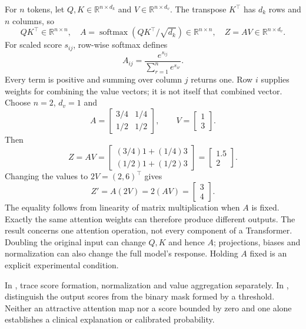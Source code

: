 For $n$ tokens, let $Q,K\in\mathbb R^{n\times d_k}$ and $V\in\mathbb R^{n\times d_v}$. The transpose $K^\top$ has $d_k$ rows and $n$ columns, so
\[
QK^\top\in\mathbb R^{n\times n},\quad
A=\operatorname{softmax}(QK^\top/\sqrt{d_k})\in\mathbb R^{n\times n},\quad
Z=AV\in\mathbb R^{n\times d_v}.
\]
For scaled score $s_{ij}$, row-wise softmax defines
\[
A_{ij}=\frac{e^{s_{ij}}}{\sum_{r=1}^n e^{s_{ir}}}.
\]
Every term is positive and summing over column $j$ returns one. Row $i$ supplies weights for combining the value vectors; it is not itself that combined vector.
Choose $n=2$, $d_v=1$ and
\[
A=\begin{bmatrix}3/4&1/4\\1/2&1/2\end{bmatrix},\qquad
V=\begin{bmatrix}1\\3\end{bmatrix}.
\]
Then
\[
Z=AV=\begin{bmatrix}(3/4)1+(1/4)3\\(1/2)1+(1/2)3\end{bmatrix}
=\begin{bmatrix}1.5\\2\end{bmatrix}.
\]
Changing the values to $2V=(2,6)^\top$ gives
\[
Z'=A(2V)=2(AV)=\begin{bmatrix}3\\4\end{bmatrix}.
\]
The equality follows from linearity of matrix multiplication when $A$ is fixed. Exactly the same attention weights can therefore produce different outputs.
The result concerns one attention operation, not every component of a Transformer. Doubling the original input can change $Q,K$ and hence $A$; projections, biases and normalization can also change the full model's response. Holding $A$ fixed is an explicit experimental condition.

In , trace score formation, normalization and value aggregation separately. In , distinguish the output scores from the binary mask formed by a threshold. Neither an attractive attention map nor a score bounded by zero and one alone establishes a clinical explanation or calibrated probability.

